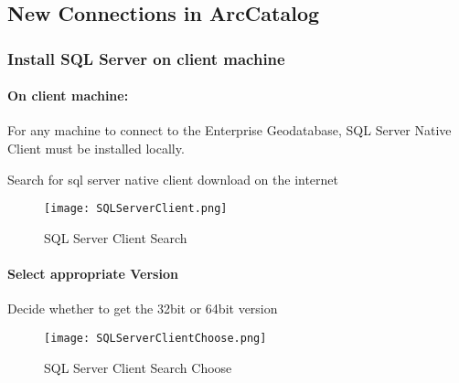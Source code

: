 %
%
%
%
% 
%
\subsection{New Connections in ArcCatalog}
\medskip
\subsubsection[Install SQL Server on client machine]{\Large Install SQL Server on client machine}
\paragraph*{On client machine:\texorpdfstring{\\}{}}

For any machine to connect to the Enterprise Geodatabase, SQL Server Native Client must be installed locally.
\vspace{.15in}

\noindent Search for sql server native client download on the internet
\begin{figure}[h!]
\centering
    \texttt{[image: SQLServerClient.png]}
\caption{SQL Server Client Search}
\end{figure}
\clearpage
%
%
%
\paragraph*{Select appropriate Version\texorpdfstring{\\}{}}
\noindent Decide whether to get the 32bit or 64bit version
\vspace{.25in}

\begin{figure}[h!]
\centering
    \texttt{[image: SQLServerClientChoose.png]}
\caption{SQL Server Client Search Choose}
\end{figure}

